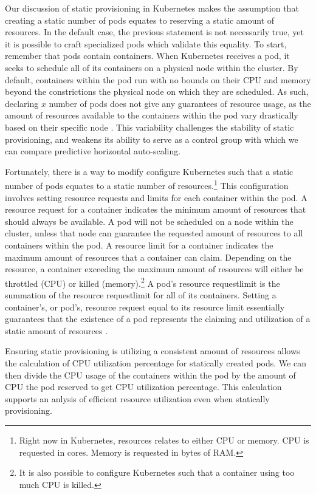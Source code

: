 Our discussion of static provisioning in Kubernetes makes the assumption that
creating a static number of pods equates to reserving a static amount of
resources. In the default case, the previous statement is not necessarily true,
yet it is possible to craft specialized pods which validate this equality. To
start, remember that pods contain containers. When Kubernetes receives a pod, it
seeks to schedule all of its containers on a physical node within the cluster.
By default, containers within the pod run with no bounds on their CPU and memory
beyond the constrictions the physical node on which they are scheduled. As such,
declaring $x$ number of pods does not give any guarantees of resource usage, as
the amount of resources available to the containers within the pod vary
drastically based on their specific node \cite{k8s-limit-range}. This variability challenges the
stability of static provisioning, and weakens its ability to serve as a control
group with which we can compare predictive horizontal auto-scaling.

Fortunately, there is a way to modify configure Kubernetes such that a static number of
pods equates to a static number of resources.\footnote{Right now in Kubernetes,
resources relates to either CPU or memory. CPU is requested in cores. Memory is
requested in bytes of RAM.} This configuration involves
setting resource requests and limits for each container within the pod. A
resource request for a container indicates the minimum amount of resources that
should always be available. A pod will not be scheduled on a node within the
cluster, unless that node can guarantee the requested amount of resources to all
containers within the pod. A resource limit for a container indicates the
maximum amount of resources that a container can claim. Depending on the
resource, a container exceeding the maximum amount of resources will either be
throttled (CPU) or killed (memory).\footnote{It is also possible to configure
Kubernetes such that a container using too much CPU is killed.} A pod's resource
request\/limit is the summation of the resource request\/limit for all of its
containers. Setting a container's, or pod's, resource request equal to its
resource limit essentially guarantees that the existence of a pod represents the
claiming and utilization of a static amount of resources
\cite{k8s-compute-resources}.

Ensuring static provisioning is utilizing a consistent amount of resources
allows the calculation of CPU utilization percentage for statically created
pods. We can then divide the CPU usage of the containers within the pod
by the amount of CPU the pod reserved to get CPU utilization percentage. This
calculation supports an anlysis of efficient resource utilization even when
statically provisioning.
